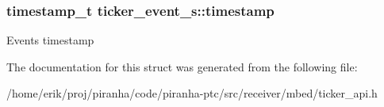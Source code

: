 \subsubsection[{\texorpdfstring{timestamp}{timestamp}}]{\setlength{\rightskip}{0pt plus 5cm}timestamp\+\_\+t ticker\+\_\+event\+\_\+s\+::timestamp}\hypertarget{structticker__event__s_a8266f0174db80330e9dc9c778028c4c3}{}\label{structticker__event__s_a8266f0174db80330e9dc9c778028c4c3}
Event\textquotesingle{}s timestamp 

The documentation for this struct was generated from the following file\+:\begin{DoxyCompactItemize}
\item 
/home/erik/proj/piranha/code/piranha-\/ptc/src/receiver/mbed/ticker\+\_\+api.\+h\end{DoxyCompactItemize}
